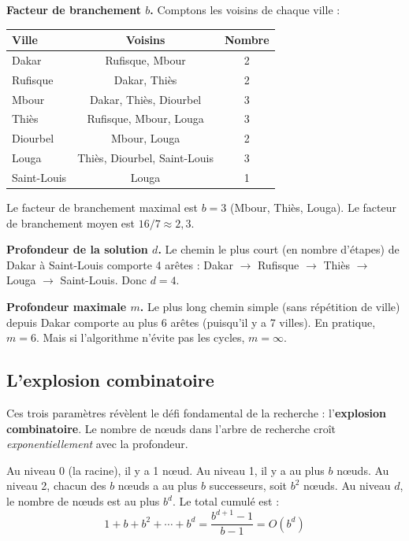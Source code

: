 \documentclass[11pt,a4paper]{article}
\begin{document}
\begin{exemplebox}
\textbf{Facteur de branchement $b$.} Comptons les voisins de chaque ville :

\begin{center}
\begin{tabular}{lcc}
\toprule
\textbf{Ville} & \textbf{Voisins} & \textbf{Nombre} \\
\midrule
Dakar & Rufisque, Mbour & 2 \\
Rufisque & Dakar, Thiès & 2 \\
Mbour & Dakar, Thiès, Diourbel & 3 \\
Thiès & Rufisque, Mbour, Louga & 3 \\
Diourbel & Mbour, Louga & 2 \\
Louga & Thiès, Diourbel, Saint-Louis & 3 \\
Saint-Louis & Louga & 1 \\
\bottomrule
\end{tabular}
\end{center}

Le facteur de branchement maximal est $b = 3$ (Mbour, Thiès, Louga). Le facteur de branchement moyen est $16/7 \approx 2{,}3$.

\textbf{Profondeur de la solution $d$.} Le chemin le plus court (en nombre d'étapes) de Dakar à Saint-Louis comporte 4 arêtes : Dakar $\rightarrow$ Rufisque $\rightarrow$ Thiès $\rightarrow$ Louga $\rightarrow$ Saint-Louis. Donc $d = 4$.

\textbf{Profondeur maximale $m$.} Le plus long chemin simple (sans répétition de ville) depuis Dakar comporte au plus 6 arêtes (puisqu'il y a 7 villes). En pratique, $m = 6$. Mais si l'algorithme n'évite pas les cycles, $m = \infty$.
\end{exemplebox}

\subsection{L'explosion combinatoire}

Ces trois paramètres révèlent le défi fondamental de la recherche : l'\textbf{explosion combinatoire}. Le nombre de nœuds dans l'arbre de recherche croît \textit{exponentiellement} avec la profondeur.

Au niveau 0 (la racine), il y a 1 nœud. Au niveau 1, il y a au plus $b$ nœuds. Au niveau 2, chacun des $b$ nœuds a au plus $b$ successeurs, soit $b^2$ nœuds. Au niveau $d$, le nombre de nœuds est au plus $b^d$. Le total cumulé est :
$$1 + b + b^2 + \cdots + b^d = \frac{b^{d+1} - 1}{b - 1} = O(b^d)$$
\end{document}
